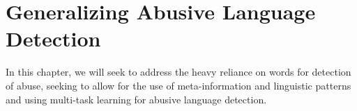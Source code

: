 {%







\section{Generalizing Abusive Language Detection}
In this chapter, we will seek to address the heavy reliance on words for detection of abuse, seeking to allow for the use of meta-information and linguistic patterns and using multi-task learning for abusive language detection.

}
